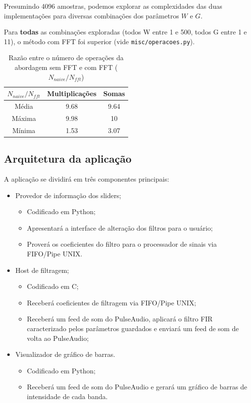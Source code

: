Presumindo 4096 amostras, podemos explorar as complexidades das duas implementações para diversas combinações dos parâmetros $W$ e $G$.

Para \textbf{todas} as combinações exploradas (todos W entre 1 e 500, todos G entre 1 e 11), o método com FFT foi superior (vide \texttt{misc/operacoes.py}).

\begin{table}[h!]
    \begin{center}
        \begin{tabular}{ |c|c|c| }
        \hline
         $N_{naive}/N_{fft}$ & \textbf{Multiplicações} & \textbf{Somas} \\ 
        \hline
        Média & 9.68 & 9.64 \\  
        Máxima & 9.98 & 10 \\
        Mínima & 1.53 & 3.07 \\
        \hline
        \end{tabular}
        \caption{Razão entre o número de operações da abordagem sem FFT e com FFT ($N_{naive}/N_{fft}$)}
    \end{center}
\end{table}

\subsection{Arquitetura da aplicação}

A aplicação se dividirá em três componentes principais:

\begin{itemize}
    \item Provedor de informação dos sliders;
    \begin{itemize}
        \item Codificado em Python;
        \item Apresentará a interface de alteração dos filtros para o usuário;
        \item Proverá os coeficientes do filtro para o processador de sinais via FIFO/Pipe UNIX.
    \end{itemize}
    \item Host de filtragem;
    \begin{itemize}
        \item Codificado em C;
        \item Receberá coeficientes de filtragem via FIFO/Pipe UNIX;
        \item Receberá um feed de som do PulseAudio, aplicará o filtro FIR caracterizado pelos parâmetros guardados e enviará um feed de som de volta ao PulseAudio;
    \end{itemize}
    \item Visualizador de gráfico de barras.
    \begin{itemize}
        \item Codificado em Python;
        \item Receberá um feed de som do PulseAudio e gerará um gráfico de barras de intensidade de cada banda.
    \end{itemize}
\end{itemize}

